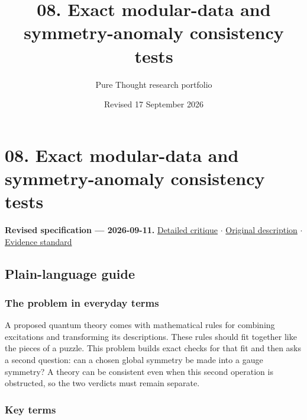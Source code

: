 \documentclass[
  11pt,
]{article}
\title{08. Exact modular-data and symmetry-anomaly consistency tests}
\author{Pure Thought research portfolio}
\date{Revised 17 September 2026}
\begin{document}
\maketitle
\thispagestyle{empty}
\clearpage

\section{08. Exact modular-data and symmetry-anomaly consistency tests}

\textbf{Revised specification --- 2026-09-11.}
\href{https://github.com/rick-stevens-ai/Pure-Thought/blob/main/reviews/08-Swampland-Modularity-Symmetries.md}{Detailed
critique} \ensuremath{\cdot}
\href{https://github.com/rick-stevens-ai/Pure-Thought/blob/main/archive/original-PRDs/08-Swampland-Modularity-Symmetries.md}{Original
description} \ensuremath{\cdot}
\href{https://github.com/rick-stevens-ai/Pure-Thought/blob/main/reviews/EVIDENCE-STANDARD.md}{Evidence
standard}

\subsection{Plain-language guide}

\subsubsection{The problem in everyday terms}

A proposed quantum theory comes with mathematical rules for combining
excitations and transforming its descriptions. These rules should fit
together like the pieces of a puzzle. This problem builds exact checks
for that fit and then asks a second question: can a chosen global
symmetry be made into a gauge symmetry? A theory can be consistent even
when this second operation is obstructed, so the two verdicts must
remain separate.

\subsubsection{Key terms}
\end{document}
